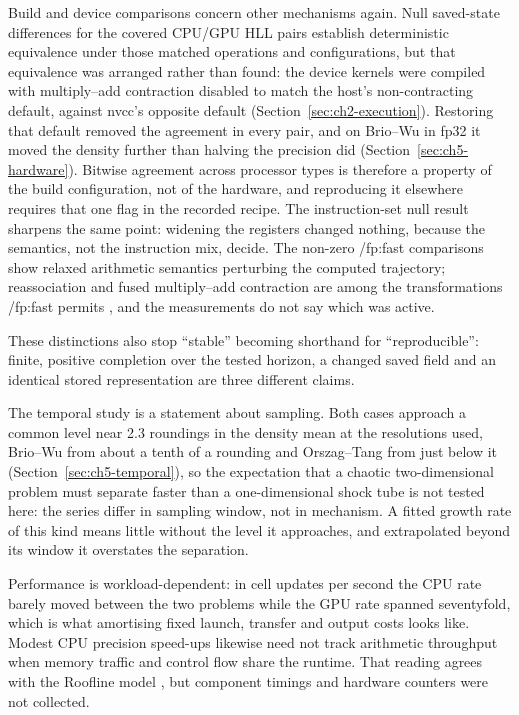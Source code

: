 Build and device comparisons concern other mechanisms again. Null saved-state
differences for the covered CPU/GPU HLL pairs establish deterministic
equivalence under those matched operations and configurations, but that
equivalence was arranged rather than found: the device kernels were compiled
with multiply--add contraction disabled to match the host's non-contracting
default, against nvcc's opposite default (Section~\ref{sec:ch2-execution}).
Restoring that default removed the agreement in every pair, and on Brio--Wu
in fp32 it moved the density further than halving the precision did
(Section~\ref{sec:ch5-hardware}). Bitwise agreement across processor types is
therefore a property of the build configuration, not of the hardware, and
reproducing it elsewhere requires that one flag in the recorded recipe. The
instruction-set null result sharpens the same point: widening the registers
changed nothing, because the semantics, not the instruction mix, decide. The non-zero /fp:fast comparisons show relaxed
arithmetic semantics perturbing the computed trajectory; reassociation and
fused multiply--add contraction are among the transformations /fp:fast permits
\citep{microsoftMsvcFp2021}, and the measurements do not say which was active.

These distinctions also stop ``stable'' becoming shorthand for
``reproducible'': finite, positive completion over the tested horizon, a
changed saved field and an identical stored representation are three different
claims.

The temporal study is a statement about sampling. Both cases approach a common
level near 2.3 roundings in the density mean at the resolutions used, Brio--Wu
from about a tenth of a rounding and Orszag--Tang from just below it
(Section~\ref{sec:ch5-temporal}), so the expectation that a chaotic
two-dimensional problem must separate faster than a one-dimensional shock tube
is not tested here: the series differ in sampling window, not in mechanism. A
fitted growth rate of this kind means little without the level it approaches,
and extrapolated beyond its window it overstates the separation.

Performance is workload-dependent: in cell updates per second the CPU rate
barely moved between the two problems while the GPU rate spanned seventyfold,
which is what amortising fixed launch, transfer and output costs looks like.
Modest CPU precision speed-ups likewise need not track arithmetic throughput
when memory traffic and control flow share the runtime. That reading agrees
with the Roofline model \citep{williamsEtAl2009roofline}, but component
timings and hardware counters were not collected.

